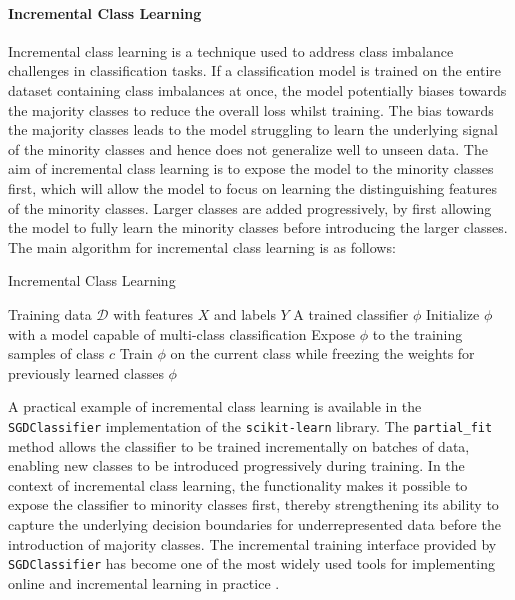 \documentclass[conference]{IEEEtran}
\begin{document}
\paragraph{Incremental Class Learning}
Incremental class learning is a technique used to address class imbalance challenges in classification tasks. If a classification model is 
trained on the entire dataset containing class imbalances at once, the model potentially biases towards the majority classes to reduce the overall loss whilst training. 
The bias towards the majority classes leads to the model struggling to learn the underlying signal of the minority classes and hence does not generalize well to unseen data. The aim 
of incremental class learning is to expose the model to the minority classes first, which will allow the model to focus on learning the distinguishing features 
of the minority classes. Larger classes are added progressively, by first allowing the model to fully learn the minority classes before introducing the larger classes. The main algorithm 
for incremental class learning is as follows:

\begin{algorithm}[H]
\caption{Incremental Class Learning}
\begin{algorithmic}[1]
\REQUIRE Training data $\mathcal{D}$ with features $X$ and labels $Y$
\ENSURE A trained classifier $\phi$
\STATE Initialize $\phi$ with a model capable of multi-class classification
    \STATE Expose $\phi$ to the training samples of class $c$
    \STATE Train $\phi$ on the current class while freezing the weights for previously learned classes
\ENDFOR
\RETURN $\phi$
\end{algorithmic}
\end{algorithm}

A practical example of incremental class learning is available in the \texttt{SGDClassifier} implementation of the \texttt{scikit-learn} library. 
The \texttt{partial\_fit} method allows the classifier to be trained incrementally on batches of data, enabling new classes to be introduced progressively during training. 
In the context of incremental class learning, the functionality makes it possible to expose the classifier to minority classes first, thereby strengthening its ability to capture 
the underlying decision boundaries for underrepresented data before the introduction of majority classes. The incremental training interface provided by \texttt{SGDClassifier} has become one of the most widely used 
tools for implementing online and incremental learning in practice \cite{pedregosa2011scikit}.
\end{document}
